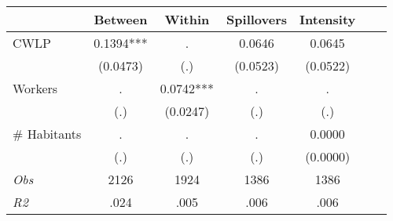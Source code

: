 \begin{tabular}{l*{6}{c}}\hline&\multicolumn{1}{c}{Between}&\multicolumn{1}{c}{Within}&\multicolumn{1}{c}{Spillovers}&\multicolumn{1}{c}{Intensity}\\ \hline 
CWLP & 0.1394*** & . & 0.0646 & 0.0645 \\
 & (0.0473) & (.) & (0.0523) & (0.0522) \\
Workers & . & 0.0742*** & . & . \\
 & (.) & (0.0247) & (.) & (.) \\
\# Habitants & . & . & . & 0.0000 \\
  & (.) & (.) & (.) & (0.0000) \\
\hline \textit{Obs} & 2126 & 1924 & 1386 & 1386  \\ \textit{R2} & .024 & .005 & .006 & .006 \\ \hline \end{tabular}
